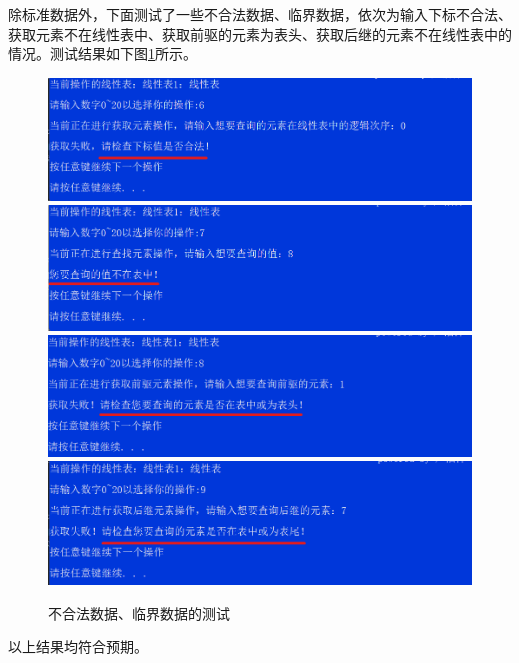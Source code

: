 \documentclass[supercite]{Experimental_Report}
\theoremstyle{definition}
\begin{document}
\begin{enumerate}
	除标准数据外，下面测试了一些不合法数据、临界数据，依次为输入下标不合法、获取元素不在线性表中、获取前驱的元素为表头、获取后继的元素不在线性表中的情况。测试结果如下图\ref{fig1-15}所示。
	\begin{figure}[htb] %
		\begin{center}
			\includegraphics[scale=0.6]{./images/顺序表/2_1.png}
			\includegraphics[scale=0.6]{./images/顺序表/2_2.png}
			\includegraphics[scale=0.6]{./images/顺序表/2_3.png}
			\includegraphics[scale=0.6]{./images/顺序表/2_4.png}
			\caption{不合法数据、临界数据的测试}
			\label{fig1-15}
		\end{center}
	\end{figure}

	以上结果均符合预期。

	\newpage


\end{enumerate}
\end{document}

